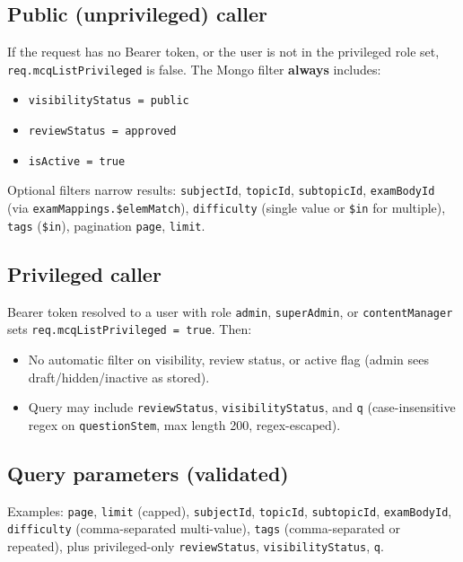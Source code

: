 \documentclass[11pt,a4paper]{article}
\begin{document}
\subsection{Public (unprivileged) caller}

If the request has no Bearer token, or the user is not in the privileged role set, \texttt{req.mcqListPrivileged} is false. The Mongo filter \textbf{always} includes:
\begin{itemize}[nosep]
  \item \texttt{visibilityStatus = public}
  \item \texttt{reviewStatus = approved}
  \item \texttt{isActive = true}
\end{itemize}
Optional filters narrow results: \texttt{subjectId}, \texttt{topicId}, \texttt{subtopicId}, \texttt{examBodyId} (via \texttt{examMappings.\$elemMatch}), \texttt{difficulty} (single value or \texttt{\$in} for multiple), \texttt{tags} (\texttt{\$in}), pagination \texttt{page}, \texttt{limit}.

\subsection{Privileged caller}

Bearer token resolved to a user with role \texttt{admin}, \texttt{superAdmin}, or \texttt{contentManager} sets \texttt{req.mcqListPrivileged = true}. Then:
\begin{itemize}[nosep]
  \item No automatic filter on visibility, review status, or active flag (admin sees draft/hidden/inactive as stored).
  \item Query may include \texttt{reviewStatus}, \texttt{visibilityStatus}, and \texttt{q} (case-insensitive regex on \texttt{questionStem}, max length 200, regex-escaped).
\end{itemize}

\subsection{Query parameters (validated)}

Examples: \texttt{page}, \texttt{limit} (capped), \texttt{subjectId}, \texttt{topicId}, \texttt{subtopicId}, \texttt{examBodyId}, \texttt{difficulty} (comma-separated multi-value), \texttt{tags} (comma-separated or repeated), plus privileged-only \texttt{reviewStatus}, \texttt{visibilityStatus}, \texttt{q}.
\end{document}
